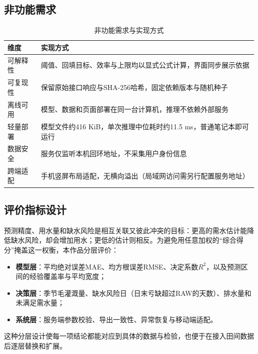 \subsection{非功能需求}
\begin{table}[H]\centering\small
\caption{非功能需求与实现方式}\label{tab:nonfunc}
\begin{tabularx}{\linewidth}{@{}p{.18\linewidth}X@{}}\toprule
维度 & 实现方式\\\midrule
可解释性 & 阈值、回填目标、效率与上限均以显式公式计算，界面同步展示依据\\
可复现性 & 保留原始接口响应与SHA-256哈希，固定依赖版本与随机种子\\
离线可用 & 模型、数据和页面部署在同一台计算机，推理不依赖外部服务\\
轻量部署 & 模型文件约416 KiB，单次推理中位耗时约11.5 ms，普通笔记本即可运行\\
数据安全 & 服务仅监听本机回环地址，不采集用户身份信息\\
跨端适配 & 手机竖屏布局适配，无横向溢出（局域网访问需另行配置服务地址）\\\bottomrule
\end{tabularx}
\end{table}

\subsection{评价指标设计}
预测精度、用水量和缺水风险是相互关联又彼此冲突的目标：更高的需水估计能降低缺水风险，却会增加用水；更低的估计则相反。为避免用任意加权的“综合得分”掩盖这一权衡，本作品分层评价：

\begin{itemize}
\item \textbf{模型层}：平均绝对误差MAE、均方根误差RMSE、决定系数$R^2$，以及预测区间的经验覆盖率与平均宽度；
\item \textbf{决策层}：季节毛灌溉量、缺水风险日（日末亏缺超过RAW的天数）、排水量和未满足需水量；
\item \textbf{系统层}：服务端参数校验、导出一致性、异常恢复与移动端适配。
\end{itemize}

这种分层设计使每一项结论都能对应到具体的数据与检验，也便于在接入田间数据后逐层替换和扩展。

